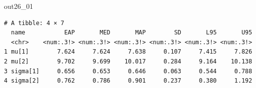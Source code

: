 \begin{MCMCout}{}{out26_01}
	\begin{verbatim}
# A tibble: 4 × 7
  name           EAP       MED       MAP        SD       L95       U95
  <chr>    <num:.3!> <num:.3!> <num:.3!> <num:.3!> <num:.3!> <num:.3!>
1 mu[1]        7.624     7.624     7.638     0.107     7.415     7.826
2 mu[2]        9.702     9.699    10.017     0.284     9.164    10.138
3 sigma[1]     0.656     0.653     0.646     0.063     0.544     0.788
4 sigma[2]     0.762     0.786     0.901     0.237     0.380     1.192
\end{verbatim}
\end{MCMCout}
